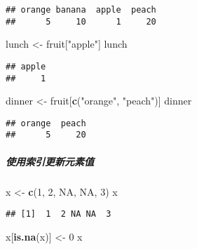 \documentclass[
]{article}
\newenvironment{Shaded}{\begin{snugshade}}{\end{snugshade}}
\newcommand{\DecValTok}[1]{\textcolor[rgb]{0.00,0.00,0.81}{#1}}
\newcommand{\KeywordTok}[1]{\textcolor[rgb]{0.13,0.29,0.53}{\textbf{#1}}}
\newcommand{\NormalTok}[1]{#1}
\newcommand{\OtherTok}[1]{\textcolor[rgb]{0.56,0.35,0.01}{#1}}
\newcommand{\StringTok}[1]{\textcolor[rgb]{0.31,0.60,0.02}{#1}}
\begin{document}
\begin{verbatim}
## orange banana  apple  peach 
##      5     10      1     20
\end{verbatim}

\begin{Shaded}
\begin{Highlighting}[]
\NormalTok{lunch <-}\StringTok{ }\NormalTok{fruit[}\StringTok{"apple"}\NormalTok{]}
\NormalTok{lunch}
\end{Highlighting}
\end{Shaded}

\begin{verbatim}
## apple 
##     1
\end{verbatim}

\begin{Shaded}
\begin{Highlighting}[]
\NormalTok{dinner <-}\StringTok{ }\NormalTok{fruit[}\KeywordTok{c}\NormalTok{(}\StringTok{"orange"}\NormalTok{, }\StringTok{"peach"}\NormalTok{)]}
\NormalTok{dinner}
\end{Highlighting}
\end{Shaded}

\begin{verbatim}
## orange  peach 
##      5     20
\end{verbatim}

\hypertarget{ux4f7fux7528ux7d22ux5f15ux66f4ux65b0ux5143ux7d20ux503c}{%
\subparagraph{使用索引更新元素值}\label{ux4f7fux7528ux7d22ux5f15ux66f4ux65b0ux5143ux7d20ux503c}}

\begin{Shaded}
\begin{Highlighting}[]
\NormalTok{x <-}\StringTok{ }\KeywordTok{c}\NormalTok{(}\DecValTok{1}\NormalTok{, }\DecValTok{2}\NormalTok{, }\OtherTok{NA}\NormalTok{, }\OtherTok{NA}\NormalTok{, }\DecValTok{3}\NormalTok{)}
\NormalTok{x}
\end{Highlighting}
\end{Shaded}

\begin{verbatim}
## [1]  1  2 NA NA  3
\end{verbatim}

\begin{Shaded}
\begin{Highlighting}[]
\NormalTok{x[}\KeywordTok{is.na}\NormalTok{(x)] <-}\StringTok{ }\DecValTok{0}
\NormalTok{x}
\end{Highlighting}
\end{Shaded}
\end{document}
